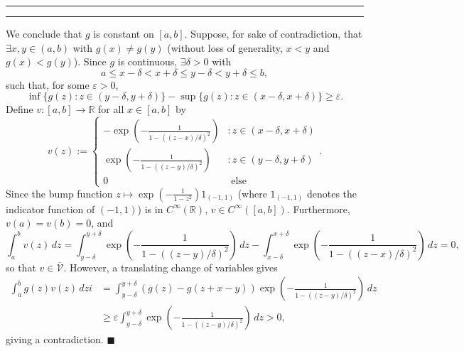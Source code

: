 \documentclass[11pt]{article}
\newcounter{questionCounter}
\newcounter{partCounter}[questionCounter]
\newenvironment{question}[2][\arabic{questionCounter}]{%
    \setcounter{partCounter}{0}%
    \vspace{.25in} \hrule \vspace{0.5em}%
        \noindent{\bf #2}%
    \vspace{0.8em} \hrule \vspace{.10in}%
    \addtocounter{questionCounter}{1}%
}{}
\renewcommand{\qed}{\quad \ensuremath{\blacksquare}}
\newcommand{\R}{\mathbb{R}}             %
\newcommand{\e}{\varepsilon}            %
\newcommand{\V}{\mathscr{V}}            %
\begin{document}
\begin{question}{Problem 7}
We conclude that $g$ is constant on $[a,b]$.
Suppose, for sake of contradiction, that $\exists x,y \in (a,b)$ with
$g(x) \neq g(y)$ (without loss of generality, $x < y$ and $g(x) < g(y)$).
Since $g$ is continuous, $\exists \delta > 0$ with
\[a \leq x - \delta < x + \delta \leq y - \delta < y + \delta \leq b,\]
such that, for some $\e > 0$,
\[\inf \{g(z) : z \in (y - \delta, y + \delta)\}
    - \sup \{g(z) : z \in (x - \delta, x + \delta)\}
\geq \e.\]
Define $v : [a,b] \to \R$ for all $x \in [a,b]$ by
\vspace{-3mm}
\[
    v(z) := \left\{
        \begin{array}{cc}
            -\exp \left( -\frac{1}{1 - ((z - x)/\delta)^2} \right)
                                        & : z \in (x - \delta,x + \delta)   \\
            \exp \left( -\frac{1}{1 - ((z - y)/\delta)^2} \right)
                                        & : z \in (y - \delta,y + \delta)   \\
            0                           & \mbox{ else}
        \end{array}
    \right..
\]
Since the bump function $z \mapsto \exp\left(
-\frac{1}{1 - z^2} \right)1_{(-1,1)}$ (where $1_{(-1,1)}$ denotes the indicator
function of $(-1,1)$) is in $C^\infty(\R)$, $v \in C^\infty([a,b])$.
Furthermore, $v(a) = v(b) = 0$, and
\vspace{-3mm}
\[\int_a^b v(z) \, dz
    = \int_{y - \delta}^{y + \delta} 
            \exp \left( -\frac{1}{1 - ((z - y)/\delta)^2} \right) \, dz
    - \int_{x - \delta}^{x + \delta} 
            \exp \left( -\frac{1}{1 - ((z - x)/\delta)^2} \right) \, dz
    = 0,
\]
so that $v \in \overline{\V}$. However, a translating change of variables gives
\vspace{-2mm}
\begin{align*}
\int_a^b g(z)v(z) \, dz
i &  = \int_{y - \delta}^{y + \delta} (g(z) - g(z + x - y))
            \exp \left( -\frac{1}{1 - ((z - y)/\delta)^2} \right) \, dz \\
 &  \geq \e \int_{y - \delta}^{y + \delta} 
            \exp \left( -\frac{1}{1 - ((z - y)/\delta)^2} \right) \, dz
    > 0,
\end{align*}
giving a contradiction. \qed
\end{question}
\end{document}
